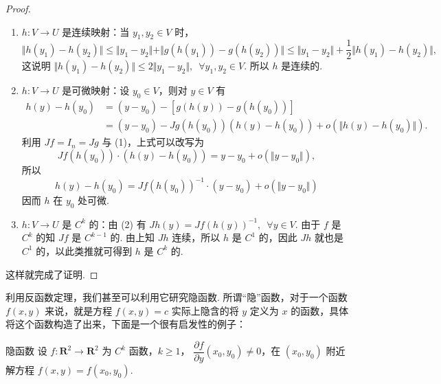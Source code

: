 \begin{proof}
    \begin{enumerate}[label=(\arabic*)]
        \item $h \colon V\to U$ 是连续映射：当 $y_1,y_2\in V$ 时，\[\Vert h(y_1) - h(y_2)\Vert \leqslant \Vert y_1 - y_2 \Vert +\Vert g(h(y_1)) - g(h(y_2))\Vert \leqslant \Vert y_1 - y_2\Vert + \frac{1}{2}\Vert h(y_1) - h(y_2)\Vert,\]
              这说明 $\Vert h(y_1) - h(y_2)\Vert \leqslant 2\Vert y_1 - y_2\Vert,\enspace \forall y_1, y_2\in V$. 所以 $h$ 是连续的.
        \item $h \colon V\to U$ 是可微映射：设 $y_0\in V$，则对 $y\in V$ 有
              \begin{align}
                  h(y) - h(y_0) & = (y - y_0) - [g(h(y)) - g(h(y_0))]                                    \\
                                & = (y - y_0) - Jg(h(y_0))(h(y) - h(y_0)) + o(\Vert h(y) - h(y_0)\Vert).
              \end{align}
              利用 $Jf = I_n = Jg$ 与 (1)，上式可以改写为\[Jf(h(y_0))\cdot(h(y) - h(y_0)) = y - y_0 + o(\Vert y - y_0\Vert),\]
              所以 \[h(y) - h(y_0) = Jf(h(y_0))^{-1}\cdot(y - y_0) + o(\Vert y - y_0\Vert)\]
              因而 $h$ 在 $y_0$ 处可微.
        \item $h \colon V\to U$ 是 $C^k$ 的：由 (2) 有 $Jh(y) = Jf(h(y))^{-1},\enspace \forall y\in V$. 由于 $f$ 是 $C^k$ 的知 $Jf$ 是 $C^{k-1}$ 的. 由上知 $Jh$ 连续，所以 $h$ 是 $C^1$ 的，因此 $Jh$ 就也是 $C^1$ 的，以此类推就可得到 $h$ 是 $C^k$ 的.
    \end{enumerate}

    这样就完成了证明.
\end{proof}

利用反函数定理，我们甚至可以利用它研究隐函数. 所谓``隐''函数，对于一个函数 $f(x, y)$ 来说，就是方程 $f(x, y) = c$ 实际上隐含的将 $y$ 定义为 $x$ 的函数，具体将这个函数构造了出来，下面是一个很有启发性的例子：

\begin{example}{}{隐函数}
    设 $f\colon\mathbf{R}^2\to\mathbf{R}^2$ 为 $C^{k}$ 函数，$k\geqslant 1$， $\dfrac{\partial f}{\partial y}(x_0, y_0)\neq 0$，在 $(x_0, y_0)$ 附近解方程 $f(x, y) = f(x_0, y_0)$.
\end{example}

